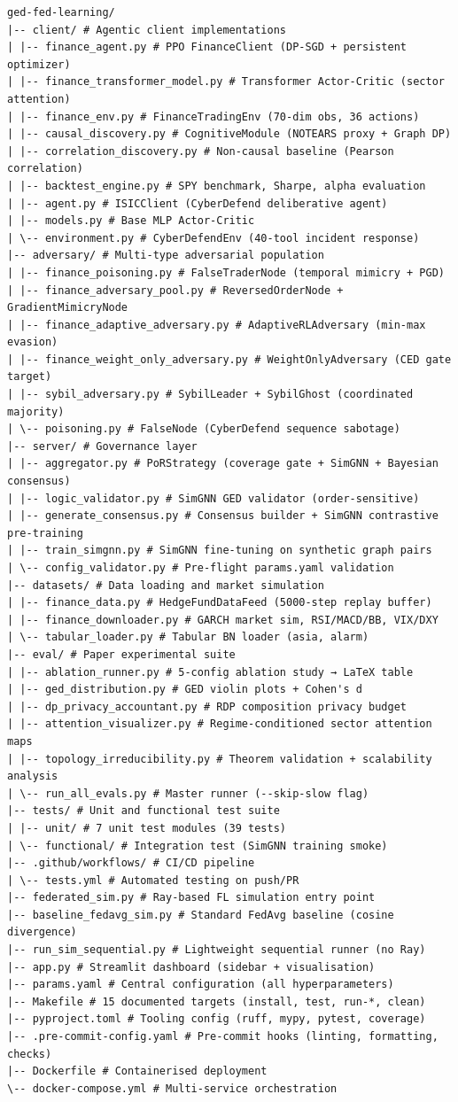 \documentclass[journal]{IEEEtran}
\begin{document}
{\tiny
\begin{verbatim}
ged-fed-learning/
|-- client/ # Agentic client implementations
| |-- finance_agent.py # PPO FinanceClient (DP-SGD + persistent optimizer)
| |-- finance_transformer_model.py # Transformer Actor-Critic (sector attention)
| |-- finance_env.py # FinanceTradingEnv (70-dim obs, 36 actions)
| |-- causal_discovery.py # CognitiveModule (NOTEARS proxy + Graph DP)
| |-- correlation_discovery.py # Non-causal baseline (Pearson correlation)
| |-- backtest_engine.py # SPY benchmark, Sharpe, alpha evaluation
| |-- agent.py # ISICClient (CyberDefend deliberative agent)
| |-- models.py # Base MLP Actor-Critic
| \-- environment.py # CyberDefendEnv (40-tool incident response)
|-- adversary/ # Multi-type adversarial population
| |-- finance_poisoning.py # FalseTraderNode (temporal mimicry + PGD)
| |-- finance_adversary_pool.py # ReversedOrderNode + GradientMimicryNode
| |-- finance_adaptive_adversary.py # AdaptiveRLAdversary (min-max evasion)
| |-- finance_weight_only_adversary.py # WeightOnlyAdversary (CED gate target)
| |-- sybil_adversary.py # SybilLeader + SybilGhost (coordinated majority)
| \-- poisoning.py # FalseNode (CyberDefend sequence sabotage)
|-- server/ # Governance layer
| |-- aggregator.py # PoRStrategy (coverage gate + SimGNN + Bayesian consensus)
| |-- logic_validator.py # SimGNN GED validator (order-sensitive)
| |-- generate_consensus.py # Consensus builder + SimGNN contrastive pre-training
| |-- train_simgnn.py # SimGNN fine-tuning on synthetic graph pairs
| \-- config_validator.py # Pre-flight params.yaml validation
|-- datasets/ # Data loading and market simulation
| |-- finance_data.py # HedgeFundDataFeed (5000-step replay buffer)
| |-- finance_downloader.py # GARCH market sim, RSI/MACD/BB, VIX/DXY
| \-- tabular_loader.py # Tabular BN loader (asia, alarm)
|-- eval/ # Paper experimental suite
| |-- ablation_runner.py # 5-config ablation study → LaTeX table
| |-- ged_distribution.py # GED violin plots + Cohen's d
| |-- dp_privacy_accountant.py # RDP composition privacy budget
| |-- attention_visualizer.py # Regime-conditioned sector attention maps
| |-- topology_irreducibility.py # Theorem validation + scalability analysis
| \-- run_all_evals.py # Master runner (--skip-slow flag)
|-- tests/ # Unit and functional test suite
| |-- unit/ # 7 unit test modules (39 tests)
| \-- functional/ # Integration test (SimGNN training smoke)
|-- .github/workflows/ # CI/CD pipeline
| \-- tests.yml # Automated testing on push/PR
|-- federated_sim.py # Ray-based FL simulation entry point
|-- baseline_fedavg_sim.py # Standard FedAvg baseline (cosine divergence)
|-- run_sim_sequential.py # Lightweight sequential runner (no Ray)
|-- app.py # Streamlit dashboard (sidebar + visualisation)
|-- params.yaml # Central configuration (all hyperparameters)
|-- Makefile # 15 documented targets (install, test, run-*, clean)
|-- pyproject.toml # Tooling config (ruff, mypy, pytest, coverage)
|-- .pre-commit-config.yaml # Pre-commit hooks (linting, formatting, checks)
|-- Dockerfile # Containerised deployment
\-- docker-compose.yml # Multi-service orchestration
\end{verbatim}
}
\end{document}
